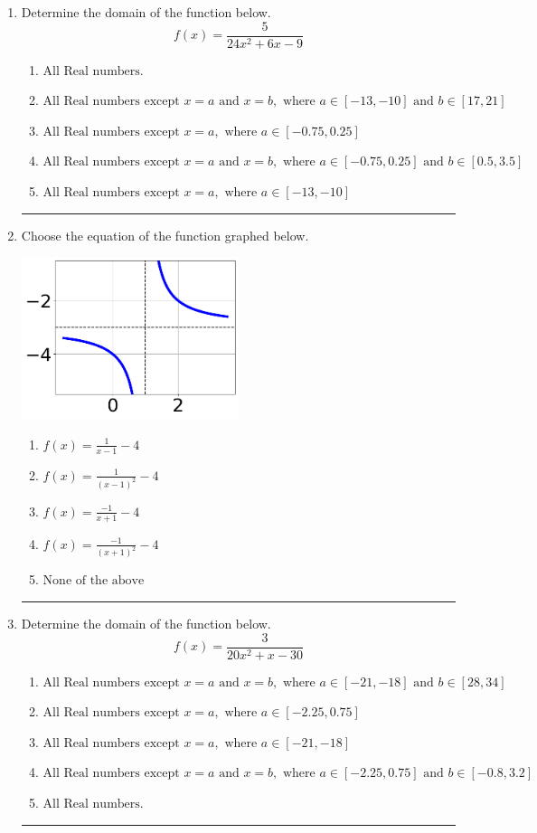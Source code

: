 \documentclass[14pt]{extbook}
\newcommand{\litem}[1]{\item#1\hspace*{-1cm}\rule{\textwidth}{0.4pt}}
\begin{document}
\begin{enumerate}
{\begin{enumerate}[label=\Alph*.]
\end{enumerate} }
\litem{
Determine the domain of the function below.\[ f(x) = \frac{5}{24x^{2} +6 x -9} \]\begin{enumerate}[label=\Alph*.]
\item \( \text{All Real numbers.} \)
\item \( \text{All Real numbers except } x = a \text{ and } x = b, \text{ where } a \in [-13, -10] \text{ and } b \in [17, 21] \)
\item \( \text{All Real numbers except } x = a, \text{ where } a \in [-0.75, 0.25] \)
\item \( \text{All Real numbers except } x = a \text{ and } x = b, \text{ where } a \in [-0.75, 0.25] \text{ and } b \in [0.5, 3.5] \)
\item \( \text{All Real numbers except } x = a, \text{ where } a \in [-13, -10] \)

\end{enumerate} }
\litem{
Choose the equation of the function graphed below.
\begin{center}
    \includegraphics[width=0.5\textwidth]{../Figures/rationalGraphToEquationC.png}
\end{center}
\begin{enumerate}[label=\Alph*.]
\item \( f(x) = \frac{1}{x - 1} - 4 \)
\item \( f(x) = \frac{1}{(x - 1)^2} - 4 \)
\item \( f(x) = \frac{-1}{x + 1} - 4 \)
\item \( f(x) = \frac{-1}{(x + 1)^2} - 4 \)
\item \( \text{None of the above} \)

\end{enumerate} }
\litem{
Determine the domain of the function below.\[ f(x) = \frac{3}{20x^{2} +x -30} \]\begin{enumerate}[label=\Alph*.]
\item \( \text{All Real numbers except } x = a \text{ and } x = b, \text{ where } a \in [-21, -18] \text{ and } b \in [28, 34] \)
\item \( \text{All Real numbers except } x = a, \text{ where } a \in [-2.25, 0.75] \)
\item \( \text{All Real numbers except } x = a, \text{ where } a \in [-21, -18] \)
\item \( \text{All Real numbers except } x = a \text{ and } x = b, \text{ where } a \in [-2.25, 0.75] \text{ and } b \in [-0.8, 3.2] \)
\item \( \text{All Real numbers.} \)


\end{enumerate}}
\end{enumerate}
\end{document}
